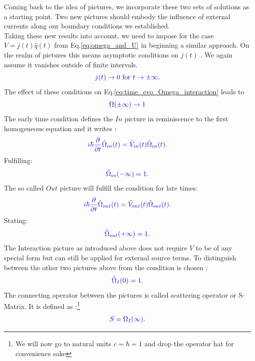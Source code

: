\documentclass[12pt, titlepage]{article}
\begin{document}
Coming back to the idea of pictures, we incorporate these two sets of solutions as a starting point. Two new pictures should embody the influence of external currents along our boundary conditions we established.
%
%
%
%
%
\\
Taking these new results into account, we need to impose for the case $  V=j(t)\hat{q}(t) $ from Eq.\eqref{eq:omega_and_U} in beginning a similar approach. On the realm of pictures this means asymptotic conditions on $ j(t) $ . We  again assume it vanishes outside of finite intervals. 
\begin{equation}
\textcolor[RGB]{0,0,204}{
j(t)\rightarrow 0 \text{ for } t\rightarrow \pm \infty
}. 
\end{equation}
The effect of these conditions on Eq.\eqref{eq:time_evo_Omega_interaction} leads to 
\begin{equation}
\textcolor[RGB]{0,0,204}{
\Omega(\pm \infty) \rightarrow 1
}
\end{equation}
The early time condition defines the $ In $ picture in reminiscence to the first homogeneous equation and it  writes :
\begin{equation}\label{eq:time_evo_Omega_in}
\textcolor[RGB]{0,0,204}{
	i\hbar
	\frac{\partial}{\partial t}
	\hat{\Omega}_{in}(t)
	=
	\hat{V}_{in}(t)
	\hat{\Omega}_{in}(t)
	.}
\end{equation}
Fulfilling:
\begin{equation}\label{eq:Omega_in_cond}
\textcolor[RGB]{0,0,204}{
	\hat{\Omega}_{in}(-\infty)
	=1
	.}
\end{equation}
The so called $ Out $ picture will fulfill the condition for late times:
\begin{equation}\label{eq:time_evo_Omega_out}
\textcolor[RGB]{0,0,204}{
	i\hbar
	\frac{\partial}{\partial t}
	\hat{\Omega}_{out}(t)
	=
	\hat{V}_{out}(t)
	\hat{\Omega}_{out}(t)
	.}
\end{equation}
Stating:
\begin{equation}\label{eq:Omega_out_cond}
\textcolor[RGB]{0,0,204}{
	\hat{\Omega}_{out}(+\infty)
	=1
	.}
\end{equation}
The Interaction picture as introduced above does not require $ V $ to be of any special form but can still be applied for external source terms. To distinguish between the other two pictures above from the condition is chosen :
\begin{equation}\label{eq:Omega_I_cond}
\textcolor[RGB]{0,0,204}{
	\hat{\Omega}_{I}(0)
	=1
	.}
\end{equation}
The connecting operator between the pictures is called scattering operator or S-Matrix. It is defined as :\footnote{We will now go to natural units $c= \hbar=1 $ and drop the operator hat for convenience sake}
\begin{equation}\label{eq:S_in_out}
\textcolor[RGB]{0,0,204}{
	S
	=\Omega_{I}(\infty)
	.}
\end{equation}
\end{document}
